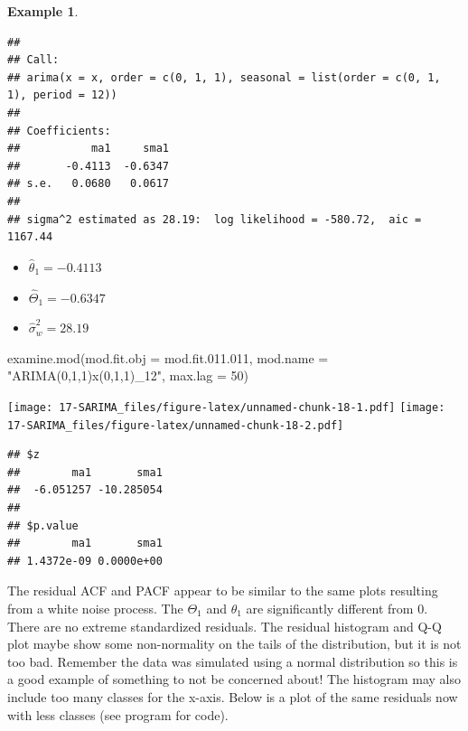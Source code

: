 \documentclass[
]{book}
\newenvironment{Shaded}{\begin{snugshade}}{\end{snugshade}}
\newcommand{\AttributeTok}[1]{\textcolor[rgb]{0.77,0.63,0.00}{#1}}
\newcommand{\ConstantTok}[1]{\textcolor[rgb]{0.00,0.00,0.00}{#1}}
\newcommand{\DecValTok}[1]{\textcolor[rgb]{0.00,0.00,0.81}{#1}}
\newcommand{\FloatTok}[1]{\textcolor[rgb]{0.00,0.00,0.81}{#1}}
\newcommand{\FunctionTok}[1]{\textcolor[rgb]{0.00,0.00,0.00}{#1}}
\newcommand{\NormalTok}[1]{#1}
\newcommand{\SpecialCharTok}[1]{\textcolor[rgb]{0.00,0.00,0.00}{#1}}
\newcommand{\StringTok}[1]{\textcolor[rgb]{0.31,0.60,0.02}{#1}}
\theoremstyle{definition}
\theoremstyle{definition}
\newtheorem{example}{Example}[chapter]
\theoremstyle{definition}
\theoremstyle{definition}
\theoremstyle{remark}
\begin{document}
\begin{example}
\begin{verbatim}
## 
## Call:
## arima(x = x, order = c(0, 1, 1), seasonal = list(order = c(0, 1, 1), period = 12))
## 
## Coefficients:
##           ma1     sma1
##       -0.4113  -0.6347
## s.e.   0.0680   0.0617
## 
## sigma^2 estimated as 28.19:  log likelihood = -580.72,  aic = 1167.44
\end{verbatim}

\begin{itemize}
\item
  \(\hat \theta_1=-0.4113\)
\item
  \(\hat \Theta_1=-0.6347\)
\item
  \(\hat \sigma_w^2=28.19\)
\end{itemize}

\begin{Shaded}
\begin{Highlighting}[]
\FunctionTok{examine.mod}\NormalTok{(}\AttributeTok{mod.fit.obj =}\NormalTok{ mod.fit.}\FloatTok{011.011}\NormalTok{, }\AttributeTok{mod.name =} 
    \StringTok{"ARIMA(0,1,1)x(0,1,1)\_12"}\NormalTok{, }\AttributeTok{max.lag =} \DecValTok{50}\NormalTok{)}
\end{Highlighting}
\end{Shaded}

\texttt{[image: 17-SARIMA\_files/figure-latex/unnamed-chunk-18-1.pdf]} \texttt{[image: 17-SARIMA\_files/figure-latex/unnamed-chunk-18-2.pdf]}

\begin{verbatim}
## $z
##        ma1       sma1 
##  -6.051257 -10.285054 
## 
## $p.value
##        ma1       sma1 
## 1.4372e-09 0.0000e+00
\end{verbatim}

The residual ACF and PACF appear to be similar to the same plots resulting from a white noise process. The \(\Theta_1\) and \(\theta_1\) are significantly different from 0. There are no extreme standardized residuals. The residual histogram and Q-Q plot maybe show some non-normality on the tails of the distribution, but it is not too bad. Remember the data was simulated using a normal distribution so this is a good example of something to not be concerned about! The histogram may also include too many classes for the x-axis. Below is a plot of the same residuals now with less classes (see program for code).

\begin{Shaded}
\end{Shaded}


\end{example}
\end{document}
